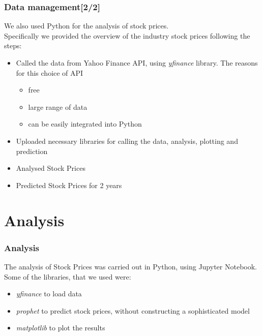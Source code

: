 \documentclass {beamer}
\begin{document}
\begin{frame}
\frametitle{Data management[2/2]}
We also used Python for the analysis of stock prices.\\
Specifically we provided the overview of the industry stock prices  following the  steps:
\begin{itemize}
\item Called the data from Yahoo Finance API, using \emph{yfinance} library. The reasons for this choice of API
	\begin{itemize}
	\item free
	\item  large range of data
	\item  can be easily integrated into Python
	\end{itemize}
\item Uploaded necessary libraries for calling the data, analysis, plotting and prediction
\item Analysed Stock Prices
\item Predicted Stock Prices for 2 years
\end{itemize}

\end{frame}

\section{Analysis}
\begin{frame}
\frametitle{Analysis}
The analysis of Stock Prices was carried out in Python, using Jupyter Notebook.\\
Some of the libraries, that we used were:
\begin{itemize}
\item \emph{yfinance} to load data
\item \emph{prophet}  to predict stock prices, without constructing a sophisticated model
\item \emph{matplotlib} to plot the results
\end{itemize}
\end{frame}
\end{document}
